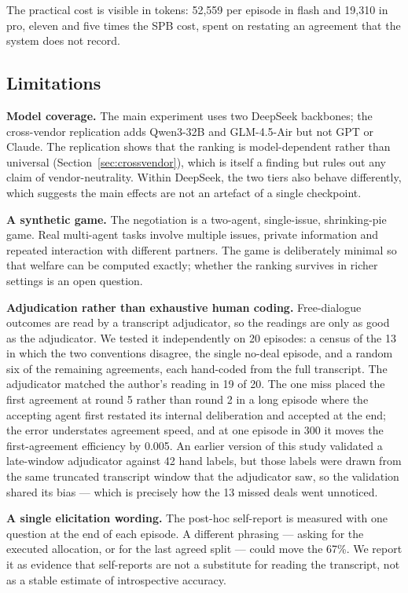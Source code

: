 \documentclass[11pt]{article}
\begin{document}
The practical cost is visible in tokens: 52{,}559 per episode in flash and 19{,}310 in pro, eleven and five times the SPB cost, spent on restating an agreement that the system does not record.

\subsection{Limitations}

\textbf{Model coverage.} The main experiment uses two DeepSeek backbones; the cross-vendor replication adds Qwen3-32B and GLM-4.5-Air but not GPT or Claude. The replication shows that the ranking is model-dependent rather than universal (Section~\ref{sec:crossvendor}), which is itself a finding but rules out any claim of vendor-neutrality. Within DeepSeek, the two tiers also behave differently, which suggests the main effects are not an artefact of a single checkpoint.

\textbf{A synthetic game.} The negotiation is a two-agent, single-issue, shrinking-pie game. Real multi-agent tasks involve multiple issues, private information and repeated interaction with different partners. The game is deliberately minimal so that welfare can be computed exactly; whether the ranking survives in richer settings is an open question.

\textbf{Adjudication rather than exhaustive human coding.} Free-dialogue outcomes are read by a transcript adjudicator, so the readings are only as good as the adjudicator. We tested it independently on 20 episodes: a census of the 13 in which the two conventions disagree, the single no-deal episode, and a random six of the remaining agreements, each hand-coded from the full transcript. The adjudicator matched the author's reading in 19 of 20. The one miss placed the first agreement at round 5 rather than round 2 in a long episode where the accepting agent first restated its internal deliberation and accepted at the end; the error understates agreement speed, and at one episode in 300 it moves the first-agreement efficiency by 0.005. An earlier version of this study validated a late-window adjudicator against 42 hand labels, but those labels were drawn from the same truncated transcript window that the adjudicator saw, so the validation shared its bias --- which is precisely how the 13 missed deals went unnoticed.

\textbf{A single elicitation wording.} The post-hoc self-report is measured with one question at the end of each episode. A different phrasing --- asking for the executed allocation, or for the last agreed split --- could move the 67\%. We report it as evidence that self-reports are not a substitute for reading the transcript, not as a stable estimate of introspective accuracy.
\end{document}
